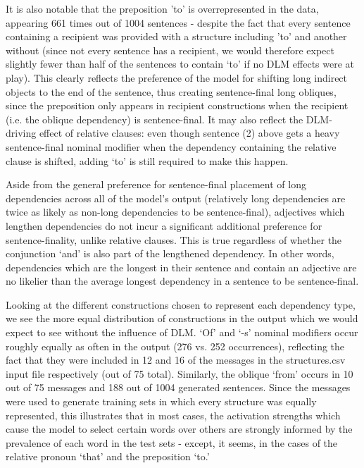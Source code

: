 \documentclass{article}
\begin{document}
It is also notable that the preposition 'to' is overrepresented in the data, appearing 661 times out of 1004 sentences - despite the fact that every sentence containing a recipient was provided with a structure including 'to' and another without (since not every sentence has a recipient, we would therefore expect slightly fewer than half of the sentences to contain `to' if no DLM effects were at play). This clearly reflects the preference of the model for shifting long indirect objects to the end of the sentence, thus creating sentence-final long obliques, since the preposition only appears in recipient constructions when the recipient (i.e. the oblique dependency) is sentence-final. It may also reflect the DLM-driving effect of relative clauses: even though sentence (2) above gets a heavy sentence-final nominal modifier when the dependency containing the relative clause is shifted, adding `to' is still required to make this happen.

Aside from the general preference for sentence-final placement of long dependencies across all of the model's output (relatively long dependencies are twice as likely as non-long dependencies to be sentence-final), adjectives which lengthen dependencies do not incur a significant additional preference for sentence-finality, unlike relative clauses. This is true regardless of whether the conjunction `and' is also part of the lengthened dependency. In other words, dependencies which are the longest in their sentence and contain an adjective are no likelier than the average longest dependency in a sentence to be sentence-final.

Looking at the different constructions chosen to represent each dependency type, we see the more equal distribution of constructions in the output which we would expect to see without the influence of DLM. `Of' and `-s' nominal modifiers occur roughly equally as often in the output (276 vs. 252 occurrences), reflecting the fact that they were included in 12 and 16 of the messages in the structures.csv input file respectively (out of 75 total). Similarly, the oblique `from' occurs in 10 out of 75 messages and 188 out of 1004 generated sentences. Since the messages were used to generate training sets in which every structure was equally represented, this illustrates that in most cases, the activation strengths which cause the model to select certain words over others are strongly informed by the prevalence of each word in the test sets - except, it seems, in the cases of the relative pronoun `that' and the preposition `to.'
\end{document}
